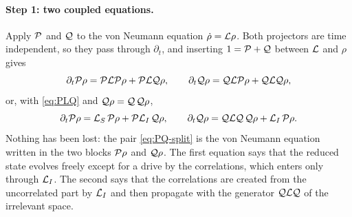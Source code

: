 \paragraph{Step 1: two coupled equations.}
Apply $\mathcal{P}$ and $\mathcal{Q}$ to the von Neumann equation $\dot\rho=\mathcal{L}\rho$.
Both projectors are time independent, so they pass through $\partial_t$, and inserting $1=\mathcal{P}+\mathcal{Q}$ between $\mathcal{L}$ and $\rho$ gives
\begin{equation}
  \partial_t\mathcal{P}\rho=\mathcal{P}\mathcal{L}\mathcal{P}\rho+\mathcal{P}\mathcal{L}\mathcal{Q}\rho,\qquad
  \partial_t\mathcal{Q}\rho=\mathcal{Q}\mathcal{L}\mathcal{P}\rho+\mathcal{Q}\mathcal{L}\mathcal{Q}\rho,
  \label{eq:PQ-split}
\end{equation}
or, with \cref{eq:PLQ} and $\mathcal{Q}\rho=\mathcal{Q}\,\mathcal{Q}\rho$,
\begin{equation}
  \partial_t\mathcal{P}\rho=\mathcal{L}_S\,\mathcal{P}\rho+\mathcal{P}\mathcal{L}_I\,\mathcal{Q}\rho,\qquad
  \partial_t\mathcal{Q}\rho=\mathcal{Q}\mathcal{L}\mathcal{Q}\,\mathcal{Q}\rho+\mathcal{L}_I\,\mathcal{P}\rho .
  \label{eq:PQ-split2}
\end{equation}
Nothing has been lost: the pair \eqref{eq:PQ-split} is the von Neumann equation written in the two blocks $\mathcal{P}\rho$ and $\mathcal{Q}\rho$.
The first equation says that the reduced state evolves freely except for a drive by the correlations, which enters only through $\mathcal{L}_I$.
The second says that the correlations are created from the uncorrelated part by $\mathcal{L}_I$ and then propagate with the generator $\mathcal{Q}\mathcal{L}\mathcal{Q}$ of the irrelevant space.

